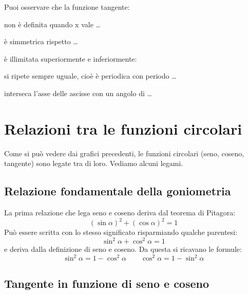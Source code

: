  \vspace{-6pt}
  \begin{center}
\begin{inaccessibleblock}
    
\end{inaccessibleblock}
  \end{center}
   \vspace{-24pt}
Puoi osservare che la funzione tangente:
\begin{itemize*}
 \item non è definita quando x vale \dots
 \item è simmetrica rispetto \dots
 \item è illimitata superiormente e inferiormente:
 \item si ripete sempre uguale, cioè è periodica con periodo \dots
 \item interseca l'asse delle ascisse con un angolo di \dots
\end{itemize*}

\section{Relazioni tra le funzioni circolari}
\label{sec:gonio_relazioni}

Come si può vedere dai grafici precedenti, le funzioni circolari (seno, 
coseno, 
tangente) sono legate tra di loro. Vediamo alcuni legami.

\subsection{Relazione fondamentale della goniometria}

La prima relazione che lega seno e coseno deriva dal teorema di Pitagora:
\[\left(\sin \alpha \right)^2 + \left(\cos \alpha \right)^2 = 1\]
Può essere scritta con lo stesso significato risparmiando qualche parentesi:
\[\sin^2 \alpha + \cos^2 \alpha = 1\]
e deriva dalla definizione di seno e coseno.
Da questa si ricavano le formule:
\[\sin^2 \alpha = 1 - \cos^2 \alpha \qquad 
  \cos^2 \alpha = 1 - \sin^2 \alpha\]

\subsection{Tangente in funzione di seno e coseno}


